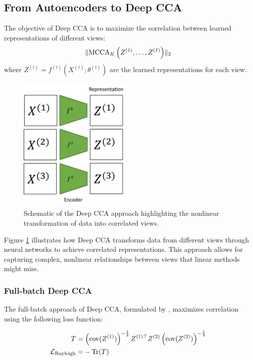 \subsection{From Autoencoders to Deep CCA}

The objective of Deep CCA is to maximize the correlation between learned representations of different views:
\begin{align}
\label{eq:DMCCA-def}
\lVert\operatorname{MCCA}_K\left(Z^{(1)}, \ldots, Z^{(I)}\right)\rVert_2
\end{align}
where $Z^{(i)} = f^{(i)}(X^{(i)}; \theta^{(i)})$ are the learned representations for each view.
\begin{figure}
\centering
\includegraphics[width=0.5\textwidth]{figures/dcca_schematic}
\caption{Schematic of the Deep CCA approach highlighting the nonlinear transformation of data into correlated views.}
\label{fig:dcca_schematic}
\end{figure}
Figure \ref{fig:dcca_schematic} illustrates how Deep CCA transforms data from different views through neural networks to achieve correlated representations. This approach allows for capturing complex, nonlinear relationships between views that linear methods might miss.

\subsubsection{Full-batch Deep CCA}
The full-batch approach of Deep CCA, formulated by \citet{andrew2013deep}, maximizes correlation using the following loss function:

\begin{align}\label{eq:T_definition}
    T          & = \left(\text{cov}(Z^{(1)})\right)^{-\frac{1}{2}} Z^{(1)\top} Z^{(2)} \left(\text{cov}(Z^{(2)})\right)^{-\frac{1}{2}} \\
    \mathcal{L}_\text{Rayleigh} & = -\operatorname{Tr}(T)
\end{align}

